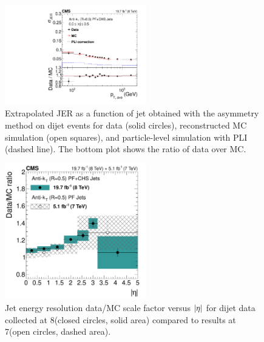 \documentclass[11pt,twoside,a4paper,cmspaper,final,collab]{cms-tdr}
\begin{document}
\begin{figure}[htbp!]
\centering
\includegraphics[width=0.55\textwidth]{Figure_040.pdf}
\caption{\label{fig:datamcjer}
Extrapolated JER as a function of jet \pt obtained with the asymmetry method on dijet events for data (solid circles), reconstructed MC simulation (open squares), and particle-level simulation with PLI (dashed line). The bottom plot shows the ratio of data over MC.
}
\end{figure}

\begin{figure}[htbp!]
\centering
\includegraphics[width=0.55\textwidth]{Figure_041.pdf}
\caption{\label{fig:kjervseta}
Jet energy resolution data/MC scale factor versus $\lvert \eta \rvert$ for dijet data collected at 8\TeV (closed circles, solid area) compared to results at 7\TeV (open circles, dashed area).
}
\end{figure}
\end{document}

